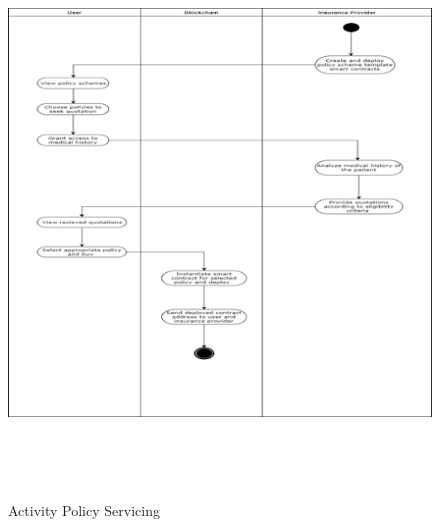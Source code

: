 \begin{figure}
	\centering
	\includegraphics[width=.8\linewidth,height=15cm]{Images/UML/ActivityPolicyServicing.png}
	\caption{ Activity Policy Servicing}
\end{figure}

